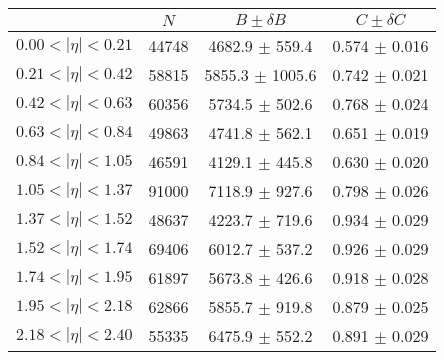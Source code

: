 \begin{tabular}{lccc}
\hline
    &   $N$   & $B \pm \delta B$  &  $C \pm \delta C$ \\
\hline
$0.00 < |\eta| <0.21$          & 44748      & 4682.9     $\pm$ 559.4 & 0.574      $\pm$ 0.016 \\
$0.21 < |\eta| <0.42$          & 58815      & 5855.3     $\pm$ 1005.6 & 0.742      $\pm$ 0.021 \\
$0.42 < |\eta| <0.63$          & 60356      & 5734.5     $\pm$ 502.6 & 0.768      $\pm$ 0.024 \\
$0.63 < |\eta| <0.84$          & 49863      & 4741.8     $\pm$ 562.1 & 0.651      $\pm$ 0.019 \\
$0.84 < |\eta| <1.05$          & 46591      & 4129.1     $\pm$ 445.8 & 0.630      $\pm$ 0.020 \\
$1.05 < |\eta| <1.37$          & 91000      & 7118.9     $\pm$ 927.6 & 0.798      $\pm$ 0.026 \\
$1.37 < |\eta| <1.52$          & 48637      & 4223.7     $\pm$ 719.6 & 0.934      $\pm$ 0.029 \\
$1.52 < |\eta| <1.74$          & 69406      & 6012.7     $\pm$ 537.2 & 0.926      $\pm$ 0.029 \\
$1.74 < |\eta| <1.95$          & 61897      & 5673.8     $\pm$ 426.6 & 0.918      $\pm$ 0.028 \\
$1.95 < |\eta| <2.18$          & 62866      & 5855.7     $\pm$ 919.8 & 0.879      $\pm$ 0.025 \\
$2.18 < |\eta| <2.40$          & 55335      & 6475.9     $\pm$ 552.2 & 0.891      $\pm$ 0.029 \\
\hline
\end{tabular}
